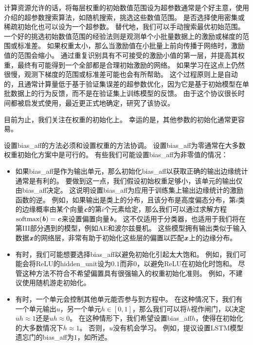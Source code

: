 计算资源允许的话，将每层权重的初始数值范围设为超参数通常是个好主意，使用介绍的超参数搜索算法，如随机搜索，挑选这些数值范围。
是否选择使用密集或稀疏初始化也可以设为一个超参数。
替代地，我们可以手动搜索最优初始范围。
一个好的挑选初始数值范围的经验法则是观测单个小批量数据上的激励或梯度的范围或标准差。
如果权重太小，那么当激励值在小批量上前向传播于网络时，激励值的范围会缩小。
通过重复识别具有不可接受的激励小值的第一层，并提高其权重，最终有可能得到一个全部都是合理初始激励的网络。
如果学习在这点上仍然很慢，观测下梯度的范围或标准差可能也会有所帮助。
这个过程原则上是自动的，且通常计算量低于基于验证集误差的超参数优化，因为它是基于初始模型在单批数据上的行为反馈，而不是在验证集上训练模型的反馈。
由于这个协议很长时间都被启发式使用，最近\cite{mishkin2015all}更正式地确定，研究了该协议。

目前为止，我们关注在权重的初始化上。
幸运的是，其他参数的初始化通常更容易。


设置\gls{bias_aff}的方法必须和设置权重的方法协调。
设置\gls{bias_aff}为零通常在大多数权重初始化方案中是可行的。
有些我们可能设置\gls{bias_aff}为非零值的情况：
\begin{itemize}
\item 如果\gls{bias_aff}是作为输出单元，那么初始化\gls{bias_aff}以获取正确的输出边缘统计通常是有利的。
要做到这一点，我们假设初始权重足够小，该单元的输出仅由\gls{bias_aff}决定。
这说明设置\gls{bias_aff}为应用于训练集上输出边缘统计的激励函数的逆。
例如，如果输出是类上的分布，且该分布是高度偏态分布，第$i$类的边缘概率由某个向量$\boldsymbol{\mathit{c}}$的第$i$个元素给定，那么我们可以通过求解方程$\text{softmax}(\boldsymbol{\mathit{b}})=\boldsymbol{\mathit{c}}$来设置偏置向量$\boldsymbol{\mathit{b}}$。
这不仅适用于分类器，也适用于我们将在第III部分遇到的模型，例如\gls{AE}和波尔兹曼机。
这些模型拥有输出类似于输入数据$\boldsymbol{\mathit{x}}$的网络层，非常有助于初始化这些层的偏置以匹配$\boldsymbol{\mathit{x}}$上的边缘分布。

\item 有时，我们可能想要选择\gls{bias_aff}以避免初始化引起太大饱和。
例如，我们可能会将ReLU的\gls{hidden_unit}设为$0.1$而非$0$，以避免ReLU在初始化时饱和。
尽管这种方法不符合不希望偏置具有很强输入的权重初始化准则。
例如，不建议使用随机游走初始化\citep{Sussillo14}。

\item 有时，一个单元会控制其他单元能否参与到方程中。
在这种情况下，我们有一个单元输出$u$，另一个单元$h\in[0,1]$，那么我们可以将$h$视作闸门，以决定$uh\approx 1$还是$uh\approx 0$。
在这种情形下，我们希望设置\gls{bias_aff}$h$，使得在初始化的大多数情况下$h\approx 1$。
否则，$u$没有机会学习。
例如，\cite{Jozefowicz-et-al-ICML2015}提议设置LSTM模型遗忘门的\gls{bias_aff}为$1$，如所述。
\end{itemize}

